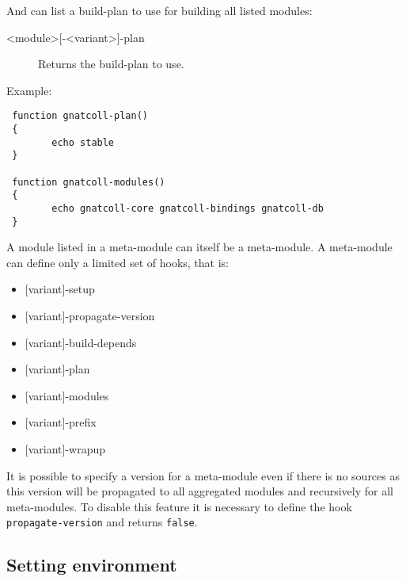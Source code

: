 \documentclass[a4paper,12pt,twoside]{article}
\newcommand{\code}[1]{\texttt{#1}}
\begin{document}
And can list a build-plan to use for building all listed modules:

\begin{description}
	\item[<module>{[}-<variant>{]}-plan] Returns the build-plan to use.
	\begin{description}[font=\textit,style=standard]
		\item[parameter] \tabto{2cm} NONE
		\item[return] \tabto{2cm} string
		\begin{enumerate}
			\item echo <plan-name>
		\end{enumerate}
	\end{description}
\end{description}

Example:

\begin{lstlisting}
 function gnatcoll-plan()
 {
		echo stable
 }

 function gnatcoll-modules()
 {
		echo gnatcoll-core gnatcoll-bindings gnatcoll-db
 }
\end{lstlisting}

A module listed in a meta-module can itself be a meta-module. A meta-module can define only a limited set of hooks, that is:

\begin{itemize}[font=\texttt]
	\item {[variant]-setup}
	\item {[variant]-propagate-version}
	\item {[variant]-build-depends}
	\item {[variant]-plan}
	\item {[variant]-modules}
	\item {[variant]-prefix}
	\item {[variant]-wrapup}
\end{itemize}

It is possible to specify a version for a meta-module even if there is no sources as this version will be propagated to all aggregated modules and recursively for all meta-modules. To disable this feature it is necessary to define the hook \code{propagate-version} and returns \code{false}.

\subsection{Setting environment}
\label{set-env}
\end{document}
